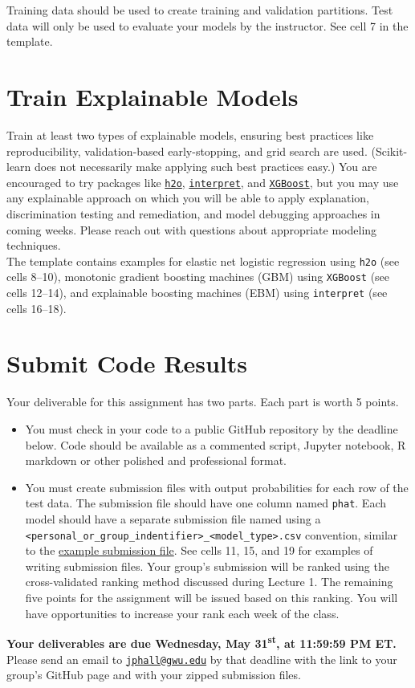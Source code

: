 \documentclass[fleqn]{article}
\begin{document}
\noindent Training data should be used to create training and validation partitions. Test data will only be used to evaluate your models by the instructor. See cell 7 in the template.

\section{Train Explainable Models}

Train at least two types of explainable models, ensuring best practices like reproducibility, validation-based early-stopping, and grid search are used. (Scikit-learn does not necessarily make applying such best practices easy.) You are encouraged to try packages like \href{https://docs.h2o.ai/h2o/latest-stable/h2o-docs/downloading.html}{\texttt{h2o}}, \href{https://github.com/interpretml/interpret}{\texttt{interpret}}, and \href{https://xgboost.readthedocs.io/en/latest/install.html}{\texttt{XGBoost}}, but you may use any explainable approach on which you will be able to apply explanation, discrimination testing and remediation, and model debugging approaches in coming weeks. Please reach out with questions about appropriate modeling techniques.\\

\noindent The template contains examples for elastic net logistic regression using \texttt{h2o} (see cells 8--10), monotonic gradient boosting machines (GBM) using \texttt{XGBoost} (see cells 12--14), and explainable boosting machines (EBM) using \texttt{interpret} (see cells 16--18). 

\section{Submit Code Results}

Your deliverable for this assignment has two parts. Each part is worth 5 points. 

\begin{itemize}
	\item You must check in your code to a public GitHub repository by the deadline below. Code should be available as a commented script, Jupyter notebook, R markdown or other polished and professional format. 
	\item You must create submission files with output probabilities for each row of the test data. The submission file should have one column named \texttt{phat}. Each model should have a separate submission file named using a \texttt{<personal\_or\_group\_indentifier>\_<model\_type>.csv} convention, similar to the \href{https://github.com/jphall663/GWU_rml/blob/master/assignments/assignment_1/ph_glm.csv}{example submission file}. See cells 11, 15, and 19 for examples of writing submission files. Your group's submission will be ranked using the cross-validated ranking method discussed during Lecture 1. The remaining five points for the assignment will be issued based on this ranking. You will have opportunities to increase your rank each week of the class. 
\end{itemize}

\noindent \textbf{Your deliverables are due Wednesday, May 31\textsuperscript{st}, at 11:59:59 PM ET.}\\

\noindent Please send an email to \href{mailto:jphall@gwu.edu}{\texttt{jphall@gwu.edu}} by that deadline with the link to your group's GitHub page and with your zipped submission files. 
\end{document}
